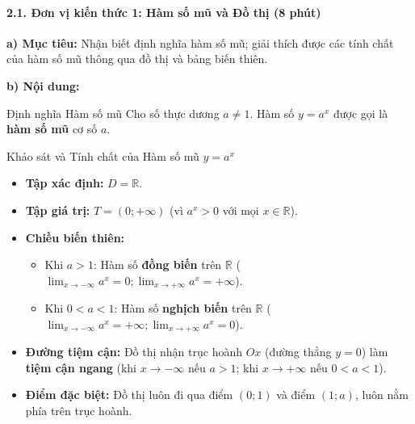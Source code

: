\documentclass[12pt, a4paper]{article}
\begin{document}
\paragraph{2.1. Đơn vị kiến thức 1: Hàm số mũ và Đồ thị (8 phút)}

\noindent \textbf{a) Mục tiêu:}
Nhận biết định nghĩa hàm số mũ; giải thích được các tính chất của hàm số mũ thông qua đồ thị và bảng biến thiên.

\noindent \textbf{b) Nội dung:}
\begin{pedabox}{Định nghĩa Hàm số mũ}
Cho số thực dương $a \neq 1$.
Hàm số $y = a^x$ được gọi là \textbf{hàm số mũ} cơ số $a$.
\end{pedabox}

\begin{pedabox}{Khảo sát và Tính chất của Hàm số mũ $y = a^x$}
\begin{itemize}[leftmargin=0.6cm]
    \item \textbf{Tập xác định:} $D = \mathbb{R}$.
    \item \textbf{Tập giá trị:} $T = (0; +\infty)$ (vì $a^x > 0$ với mọi $x \in \mathbb{R}$).
    \item \textbf{Chiều biến thiên:}
    \begin{itemize}
        \item Khi $a > 1$: Hàm số \textbf{đồng biến} trên $\mathbb{R}$ ($\lim_{x \to -\infty} a^x = 0; \lim_{x \to +\infty} a^x = +\infty$).
        \item Khi $0 < a < 1$: Hàm số \textbf{nghịch biến} trên $\mathbb{R}$ ($\lim_{x \to -\infty} a^x = +\infty; \lim_{x \to +\infty} a^x = 0$).
    \end{itemize}
    \item \textbf{Đường tiệm cận:} Đồ thị nhận trục hoành $Ox$ (đường thẳng $y = 0$) làm \textbf{tiệm cận ngang} (khi $x \to -\infty$ nếu $a > 1$; khi $x \to +\infty$ nếu $0 < a < 1$).
    \item \textbf{Điểm đặc biệt:} Đồ thị luôn đi qua điểm $(0; 1)$ và điểm $(1; a)$, luôn nằm phía trên trục hoành.
\end{itemize}
\end{pedabox}
\end{document}
